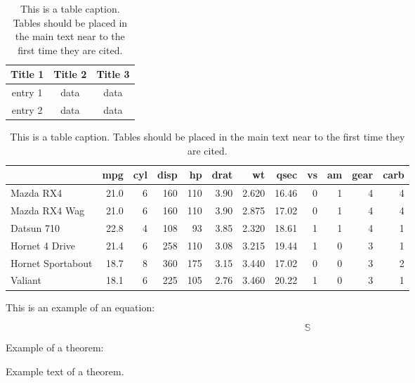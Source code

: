 \documentclass[Agronomy,article,submit,moreauthors,pdftex]{mdpi}
\begin{document}
\begin{table}[H]
\caption{This is a table caption. Tables should be placed in the main text near to the first time they are cited.}
\centering
\begin{tabular}{ccc}
\toprule
\textbf{Title 1}    & \textbf{Title 2}  & \textbf{Title 3}\\
\midrule
entry 1     & data          & data\\
entry 2     & data          & data\\
\bottomrule
\end{tabular}
\end{table}

\begin{table}

\caption{This is a table caption. Tables should be placed in the main text near to the first time they are cited.}
\centering
\begin{tabular}[t]{lrrrrrrrrrrr}
\toprule
\textbf{ } & \textbf{mpg} & \textbf{cyl} & \textbf{disp} & \textbf{hp} & \textbf{drat} & \textbf{wt} & \textbf{qsec} & \textbf{vs} & \textbf{am} & \textbf{gear} & \textbf{carb}\\
\midrule
Mazda RX4 & 21.0 & 6 & 160 & 110 & 3.90 & 2.620 & 16.46 & 0 & 1 & 4 & 4\\
Mazda RX4 Wag & 21.0 & 6 & 160 & 110 & 3.90 & 2.875 & 17.02 & 0 & 1 & 4 & 4\\
Datsun 710 & 22.8 & 4 & 108 & 93 & 3.85 & 2.320 & 18.61 & 1 & 1 & 4 & 1\\
Hornet 4 Drive & 21.4 & 6 & 258 & 110 & 3.08 & 3.215 & 19.44 & 1 & 0 & 3 & 1\\
Hornet Sportabout & 18.7 & 8 & 360 & 175 & 3.15 & 3.440 & 17.02 & 0 & 0 & 3 & 2\\
\addlinespace
Valiant & 18.1 & 6 & 225 & 105 & 2.76 & 3.460 & 20.22 & 1 & 0 & 3 & 1\\
\bottomrule
\end{tabular}
\end{table}

This is an example of an equation:

\begin{equation}
\mathbb{S}
\end{equation}

Example of a theorem:

\begin{Theorem}
Example text of a theorem.
\end{Theorem}
\end{document}
